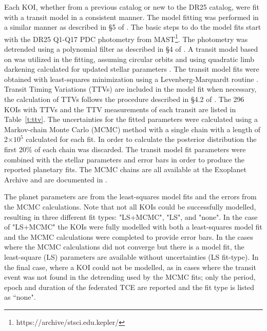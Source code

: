 \label{s:mcmc}

Each KOI, whether from a previous catalog or new to the DR25 catalog, were fit with a transit model in a consistent manner. The model fitting was performed in a similar manner as described in \S5 of \citet{Rowe2015cat}. The basic steps to do the model fits start with the DR25 Q1-Q17 PDC photometry from MAST\footnote{https://archive/stsci.edu.kepler/}. The photometry was detrended using a polynomial filter as described in \S4 of \citet{Rowe2014}. A transit model based on \citet{Mandel2002} was utilized in the fitting, assuming circular orbits and using quadratic limb darkening \citep{Claret2011} calculated for updated stellar parameters \citep{Mathur2017ApJS}. The transit model fits were obtained with least-squares minimization using a Levenberg-Marquardt routine \citep{More1980}. Transit Timing Variations (TTVs) are included in the model fit when necessary, the calculation of TTVs follows the procedure described in \S4.2 of \citet{Rowe2014}. The 296 KOIs with TTVs and the TTV measurements of each transit are listed in Table~\ref{t:ttv}. The uncertainties for the fitted parameters were calculated using a Markov-chain Monte Carlo (MCMC) method \citep{Ford2005AJ} with a single chain with a length of 2$\times 10^{5}$ calculated for each fit. In order to calculate the posterior distribution the first 20\% of each chain was discarded. The transit model fit parameters were combined with the stellar parameters and error bars \citep{Mathur2017ApJS} in order to produce the reported planetary fits. The MCMC chains are all available at the Exoplanet Archive and are documented in \citet{Hoffman2017}. 

The planet parameters are from the least-squares model fits and the errors from the MCMC calculations. Note that not all KOIs could be successfully modelled, resulting in three different fit types: "LS+MCMC", "LS", and "none". In the case of "LS+MCMC" the KOIs were fully modelled with both a least-squares model fit and the MCMC calculations were completed to provide error bars. In the cases where the MCMC calculations did not converge but there is a model fit, the least-square (LS) parameters are available without uncertainties (LS fit-type). In the final case, where a KOI could not be modelled, as in cases where the transit event was not found in the detrending used by the MCMC fits; only the period, epoch and duration of the federated TCE are reported and the fit type is listed as ``none".

